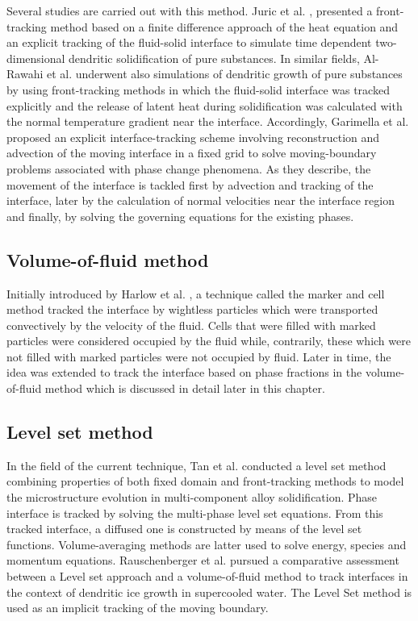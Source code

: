 \setlength{\parindent}{0.5cm} Several studies are carried out with this method. Juric et al. \cite{juric_tryggvason_1996}, presented a front-tracking method based on a finite difference approach of the heat equation and an explicit tracking of the fluid-solid interface to simulate time dependent two-dimensional dendritic solidification of pure substances. In similar fields, Al-Rawahi et al. \cite{al-rawahi_tryggvason_2002} underwent also simulations of dendritic growth of pure substances by using front-tracking methods in which the fluid-solid interface was tracked explicitly and the release of latent heat during solidification was calculated with the normal temperature gradient near the interface. Accordingly, Garimella et al. \cite{li_garimella_simpson_2003} proposed an explicit interface-tracking scheme involving reconstruction and advection of the moving interface in a fixed grid to solve moving-boundary problems associated with phase change phenomena. As they describe, the movement of the interface is tackled first by advection and tracking of the interface, later by the calculation of normal velocities near the interface region and finally, by solving the governing equations for the existing phases.

\subsection*{Volume-of-fluid method}

\setlength{\parindent}{0.5cm} Initially introduced by Harlow et al. \cite{harlow_welch_1965}, a technique called the marker and cell method tracked the interface by wightless particles which were transported convectively by the velocity of the fluid. Cells that were filled with marked particles were considered occupied by the fluid while, contrarily, these which were not filled with marked particles were not occupied by fluid. Later in time, the idea was extended to track the interface based on phase fractions in the volume-of-fluid method which is discussed in detail later in this chapter.

\subsection*{Level set method}

\setlength{\parindent}{0.5cm} In the field of the current technique, Tan et al. \cite{tan_zabaras_2007} conducted a level set method combining properties of both fixed domain and front-tracking methods to model the microstructure evolution in multi-component alloy solidification. Phase interface is tracked by solving the multi-phase level set equations. From this tracked interface, a diffused one is constructed by means of the level set functions. Volume-averaging methods are latter used to solve energy, species and momentum equations.  Rauschenberger et al. \cite{rauschenberger_criscione_eisenschmidt_kintea_jakirlic_tukovic_roisman_weigand_tropea_2013} pursued a comparative assessment between a Level set approach and a volume-of-fluid method to track interfaces in the context of dendritic ice growth in supercooled water. The Level Set method is used as an implicit tracking of the moving boundary.

